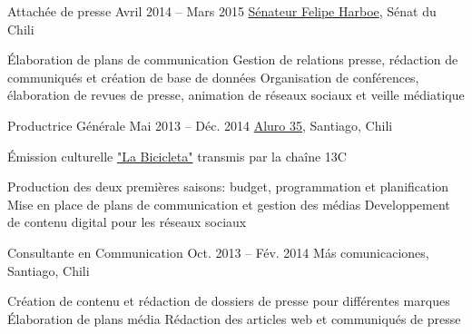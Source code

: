 \begin{joblist}[13.2][7.8][3.4]
{{\begin{itemize}
		\end{itemize}      
        }
	}



\item[Attachée de presse]{Avril 2014 -- Mars 2015}
     {
     \href{https://www.harboe.cl/}{Sénateur Felipe Harboe}, Sénat du Chili
     } 
	 {
        \normalsize{
		\iftbftiny \vspace{-0.5cm} \fi
			\begin{itemize}
			  \iftbftiny \setlength\itemsep{-3pt} \fi
			  \cvitem[\checkmark] Élaboration de plans de communication
			  \cvitem[\checkmark] Gestion de relations presse, rédaction de communiqués et création de base de données
			  \cvitem[\checkmark] Organisation de conférences, élaboration de revues de presse, animation de réseaux sociaux et veille médiatique
			\end{itemize}     
		}	
	}
    
    
    
\item[Productrice Générale]{Mai 2013 -- Déc. 2014}
     {
     \href{https://www.aluro35.com/}{Aluro 35}, Santiago, Chili
     }
     {Émission culturelle \href{http://www.13.cl/c/programas/la-bicicleta}{"La Bicicleta"} transmis par la chaîne 13C \\

        \normalsize{
		\iftbftiny \vspace{-0.5cm} \fi
			\begin{itemize}
			  \iftbftiny \setlength\itemsep{-3pt} \fi
			  \cvitem[\checkmark] Production des deux premières saisons: budget, programmation et planification             
			  \cvitem[\checkmark] Mise en place de plans de communication et gestion des médias
			  \cvitem[\checkmark] Developpement de contenu digital pour les réseaux sociaux
			\end{itemize}     
		}	
	}



\item[Consultante en Communication]{Oct. 2013 -- Fév. 2014 }     
  	{
  	Más comunicaciones, Santiago, Chili
  	}     
  	{
        \normalsize{
		\iftbftiny \vspace{-0.5cm} \fi
		\begin{itemize}
			  \iftbftiny \setlength\itemsep{-3pt} \fi
			  \cvitem[\checkmark]  Création de contenu et rédaction de dossiers de presse pour différentes marques                                
			  \cvitem[\checkmark]  Élaboration de plans média                                    
			  \cvitem[\checkmark]  Rédaction des articles web et communiqués de presse
			  

\end{itemize}}}
\end{joblist}

